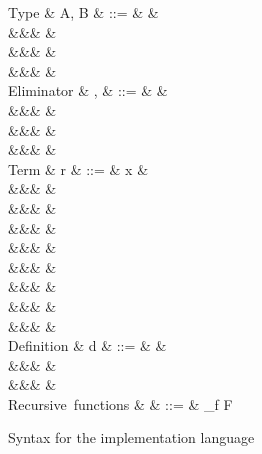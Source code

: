 \begin{figure}
\begin{syntaxfig}
\mbox{Type}
&
A, B
&
::=
&
\tyInt
&
\\
&&&
\tyList
&
\\
&&&
&
\\
&&&
&
\\[2mm]
\mbox{Eliminator}
&
\sigma, \tau
&
::=
&
&
\\
&&&
&
\\
&&&
&
\\
&&&
&
\\[2mm]
\mbox{Term}
&
r
&
::=
&
x
&
\\
&&&
&
\\
&&&
\phi
&
\\
&&&
\exFun{\sigma}
&
\\
&&&
&
\\
&&&
&
\\
&&&
&
\\
&&&
&
\\
&&&
&
\\[2mm]
\mbox{Definition}
&
d
&
::=
&
&
\\
&&&
\exLetrecDef{\delta}
&
\\
&&&
&
\\[2mm]
\mbox{Recursive functions}
&
\delta
&
::=
&
_{f \in F}
\end{syntaxfig}
\caption{Syntax for the implementation language}
\label{fig:impl-language:syntax}
\end{figure}
